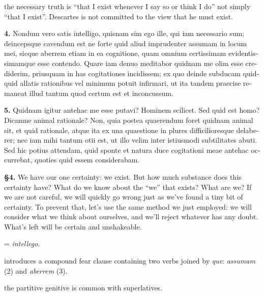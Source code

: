  the necessary truth is ``that I exist whenever I say so or think I do'' not simply ``that I exist''. Descartes is not committed to the view that he must exist.

\clearpage

\beginnumbering
\pstart
\begin{latin}
    \textenglish{\textbf{4.}} Nondum vero satis intelligo, quisnam sim ego ille, qui iam necessario sum; deincepsque cavendum est ne forte quid aliud imprudenter assumam in locum mei, sicque aberrem etiam in ea cognitione, quam omnium certissimam evidentissimamque esse contendo. Quare iam denuo meditabor quidnam me olim esse crediderim, priusquam in has cogitationes incidissem; ex quo deinde subducam quidquid allatis rationibus vel minimum potuit infirmari, ut ita tandem praecise remaneat illud tantum quod certum est et inconcussum.
\end{latin}
\pend
\endnumbering

\beginnumbering
\pstart
\begin{latin}
    \textenglish{\textbf{5.}} Quidnam igitur antehac me esse putavi? Hominem scilicet. Sed quid est homo? Dicamne animal rationale? Non, quia postea quaerendum foret quidnam animal sit, et quid rationale, atque ita ex una quaestione in plures difficilioresque delaberer; nec iam mihi tantum otii est, ut illo velim inter istiusmodi subtilitates abuti. Sed hic potius attendam, quid sponte  et natura duce cogitationi meae antehac occurrebat, quoties quid essem considerabam.
\end{latin}
\pend
\endnumbering

\prenotes

\textbf{§4.} We have our one certainty: we exist. But how much substance does this certainty have? What do we know about the ``we'' that exists? What are we? If we are not careful, we will quickly go wrong just as we've found a tiny bit of certainty. To prevent that, let's use the same method we just employed: we will consider what we think about ourselves, and we'll reject whatever has any doubt. What's left will be certain and unshakeable.

 = \textit{intellego}.

 introduces a compound fear clause containing two verbs joined by \textit{que}: \textit{assumam} (2) and \textit{aberrem} (3).

 the partitive genitive is common with superlatives.

